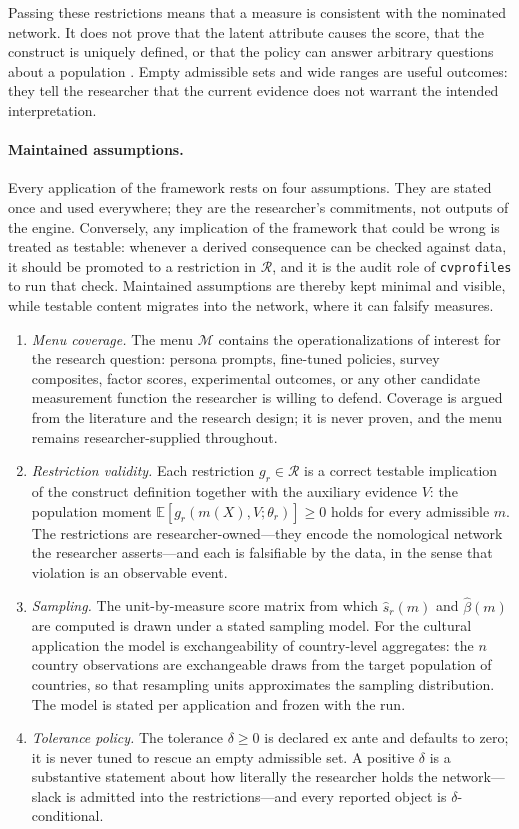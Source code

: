 \documentclass[10pt,letterpaper]{article}
\newcommand{\cvp}{\texttt{cvprofiles}}
\newcommand{\M}{\ensuremath{\mathcal{M}}}
\newcommand{\E}{\mathbb{E}}
\begin{document}
Passing these restrictions means that a measure is consistent with the nominated network. It does not prove that the latent attribute causes the score, that the construct is uniquely defined, or that the policy can answer arbitrary questions about a population \cite{borsboom2004}. Empty admissible sets and wide ranges are useful outcomes: they tell the researcher that the current evidence does not warrant the intended interpretation.

\paragraph{Maintained assumptions.}
Every application of the framework rests on four assumptions. They are stated once and used everywhere; they are the researcher's commitments, not outputs of the engine. Conversely, any implication of the framework that could be wrong is treated as testable: whenever a derived consequence can be checked against data, it should be promoted to a restriction in $\mathcal{R}$, and it is the audit role of \cvp{} to run that check. Maintained assumptions are thereby kept minimal and visible, while testable content migrates into the network, where it can falsify measures.

\begin{enumerate}
\item[(A1)] \emph{Menu coverage.} The menu $\M$ contains the operationalizations of interest for the research question: persona prompts, fine-tuned policies, survey composites, factor scores, experimental outcomes, or any other candidate measurement function the researcher is willing to defend. Coverage is argued from the literature and the research design; it is never proven, and the menu remains researcher-supplied throughout.
\item[(A2)] \emph{Restriction validity.} Each restriction $g_r\in\mathcal{R}$ is a correct testable implication of the construct definition together with the auxiliary evidence $V$: the population moment $\E[g_r(m(X),V;\theta_r)]\ge 0$ holds for every admissible $m$. The restrictions are researcher-owned---they encode the nomological network the researcher asserts---and each is falsifiable by the data, in the sense that violation is an observable event.
\item[(A3)] \emph{Sampling.} The unit-by-measure score matrix from which $\hat{s}_r(m)$ and $\hat{\beta}(m)$ are computed is drawn under a stated sampling model. For the cultural application the model is exchangeability of country-level aggregates: the $n$ country observations are exchangeable draws from the target population of countries, so that resampling units approximates the sampling distribution. The model is stated per application and frozen with the run.
\item[(A4)] \emph{Tolerance policy.} The tolerance $\delta\ge 0$ is declared ex ante and defaults to zero; it is never tuned to rescue an empty admissible set. A positive $\delta$ is a substantive statement about how literally the researcher holds the network---slack is admitted into the restrictions---and every reported object is $\delta$-conditional.
\end{enumerate}
\end{document}
